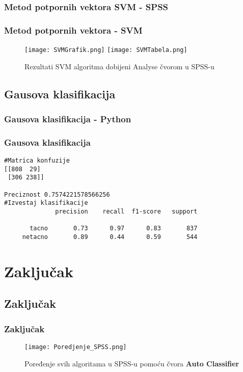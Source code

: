 \documentclass{beamer}
\begin{document}
\subsubsection*{Metod potpornih vektora SVM - SPSS}
\begin{frame}[fragile]
\frametitle{Metod potpornih vektora - SVM}

\begin{figure}
\texttt{[image: SVMGrafik.png]}
\texttt{[image: SVMTabela.png]}
\caption{Rezultati SVM algoritma dobijeni Analyse čvorom u SPSS-u}
\end{figure}

\end{frame}

\subsection{Gausova klasifikacija}
\subsubsection*{Gausova klasifikacija - Python}
\begin{frame}[fragile]
\frametitle{Gausova klasifikacija}

\begin{lstlisting}
#Matrica konfuzije
[[808  29]
 [306 238]]

Preciznost 0.7574221578566256
#Izvestaj klasifikacije
              precision    recall  f1-score   support

       tacno       0.73      0.97      0.83       837
     netacno       0.89      0.44      0.59       544

\end{lstlisting}
\end{frame}


\section{Zaključak}
\subsection*{Zaključak}
\begin{frame}[fragile]
\frametitle{Zaključak}

\begin{figure}[ht!]
    \centering
    \texttt{[image: Poredjenje\_SPSS.png]}
    \caption{Poređenje svih algoritama u SPSS-u pomoću čvora \textbf{Auto Classifier}}
    \label{fig:Poredjenje_SPSS}
\end{figure}
\end{frame}
\end{document}
